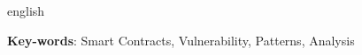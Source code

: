 \begin{resumo}[Abstract]
 \begin{otherlanguage*}{english}


   \vspace{\onelineskip}

   \noindent
   \textbf{Key-words}: Smart Contracts, Vulnerability, Patterns, Analysis
 \end{otherlanguage*}
\end{resumo}

